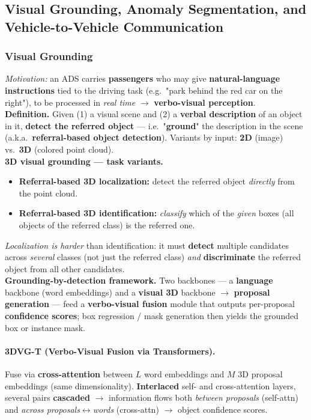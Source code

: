 \documentclass{article}
\begin{document}
\subsection{Visual Grounding, Anomaly Segmentation, and Vehicle-to-Vehicle Communication}
\subsubsection{Visual Grounding}
\textit{Motivation:} an ADS carries \textbf{passengers} who may give \textbf{natural-language instructions} tied to the driving task (e.g.\ "park behind the red car on the right"), to be processed in \textit{real time} $\rightarrow$ \textbf{verbo-visual perception}.\\

\textbf{Definition.} Given (1) a visual scene and (2) a \textbf{verbal description} of an object in it, \textbf{detect the referred object} --- i.e.\ "\textbf{ground}" the description in the scene (a.k.a.\ \textbf{referral-based object detection}). Variants by input: \textbf{2D} (image) vs.\ \textbf{3D} (colored point cloud).\\

\textbf{3D visual grounding --- task variants.}
\begin{itemize}
    \item \textbf{Referral-based 3D localization:} detect the referred object \textit{directly} from the point cloud.
    \item \textbf{Referral-based 3D identification:} \textit{classify} which of the \textit{given} boxes (all objects of the referred class) is the referred one.
\end{itemize}
\textit{Localization is harder} than identification: it must \textbf{detect} multiple candidates across \textit{several} classes (not just the referred class) \textit{and} \textbf{discriminate} the referred object from all other candidates.\\

\textbf{Grounding-by-detection framework.} Two backbones --- a \textbf{language} backbone (word embeddings) and a \textbf{visual 3D} backbone $\rightarrow$ \textbf{proposal generation} --- feed a \textbf{verbo-visual fusion} module that outputs per-proposal \textbf{confidence scores}; box regression / mask generation then yields the grounded box or instance mask.

\paragraph{3DVG-T (Verbo-Visual Fusion via Transformers).}
Fuse via \textbf{cross-attention} between $L$ word embeddings and $M$ 3D proposal embeddings (same dimensionality). \textbf{Interlaced} self- and cross-attention layers, several pairs \textbf{cascaded} $\rightarrow$ information flows both \textit{between proposals} (self-attn) and \textit{across proposals$\leftrightarrow$words} (cross-attn) $\rightarrow$ object confidence scores.
\end{document}
